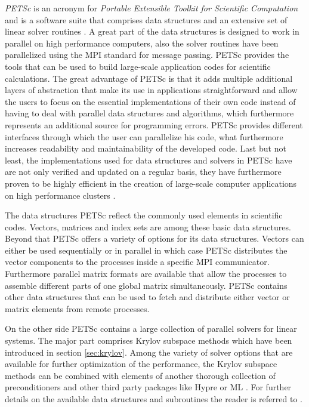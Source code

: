 \emph{PETSc} is an acronym for \emph{Portable Extensible Toolkit for Scientific Computation} and is a software suite that comprises data structures and an extensive set of linear solver routines \cite{petsc-web-page,petsc-efficient}. A great part of the data structures is designed to work in parallel on high performance computers, also the solver routines have been parallelized using the MPI standard for message passing. PETSc provides the tools that can be used to build large-scale application codes for scientific calculations. The great advantage of PETSc is that it adds multiple additional layers of abstraction that make its use in applications straightforward and allow the users to focus on the essential implementations of their own code instead of having to deal with parallel data structures and algorithms, which furthermore represents an additional source for programming errors. PETSc provides different interfaces through which the user can parallelize his code, what furthermore increases readability and maintainability of the developed code. Last but not least, the implementations used for data structures and solvers in PETSc have are not only verified and updated on a regular basis, they have furthermore proven to be highly efficient in the creation of large-scale computer applications on high performance clusters \cite{bonfiglioli12,gropp00,karimian05}.

The data structures PETSc reflect the commonly used elements in scientific codes. Vectors, matrices and index sets are among these basic data structures. Beyond that PETSc offers a variety of options for its data structures. Vectors can either be used sequentially or in parallel in which case PETSc distributes the vector components to the processes inside a specific MPI communicator. Furthermore parallel matrix formats are available that allow the processes to assemble different parts of one global matrix simultaneously. PETSc contains other data structures that can be used to fetch and distribute either vector or matrix elements from remote processes.

On the other side PETSc contains a large collection of parallel solvers for linear systems. The major part comprises Krylov subspace methods which have been introduced in section \ref{sec:krylov}. Among the variety of solver options that are available for further optimization of the performance, the Krylov subspace methods can be combined with elements of another thorough collection of preconditioners and other third party packages like Hypre \cite{hypre} or ML \cite{ml}. For further details on the available data structures and subroutines the reader is referred to \cite{petsc-user-ref,petsc-web-page}.

